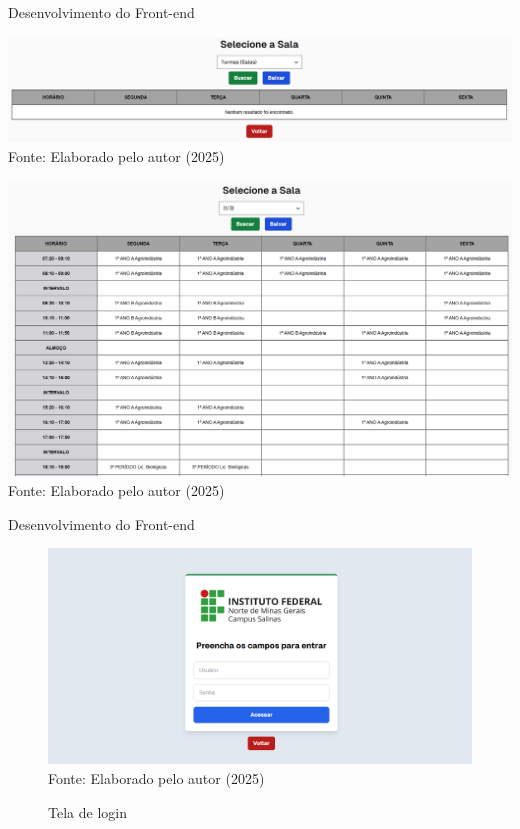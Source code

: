 \begin{frame}{Desenvolvimento do Front-end}
    \begin{minipage}{0.48\textwidth}
        \centering
        \includegraphics[width=1\textwidth]{figuras/front-7.png}
        \footnotesize Fonte: Elaborado pelo autor (2025)
    \end{minipage}
    \hfill
    \begin{minipage}{0.48\textwidth}
        \centering
        \includegraphics[width=1\textwidth]{figuras/front-8.png}
        \footnotesize Fonte: Elaborado pelo autor (2025)
    \end{minipage}
\end{frame}

\begin{frame}{Desenvolvimento do Front-end}
    \begin{figure}
        \centering
        \vspace{-0.5cm}
        \caption{Tela de login}
        \vspace{-0.2cm}
        \includegraphics[width=1\textwidth]{figuras/front-9.png}
        \\ %
        \footnotesize Fonte: Elaborado pelo autor (2025)
    \end{figure}
\end{frame}

